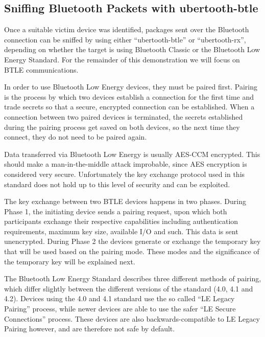 \begin{itemize}

\subsection{Sniffing Bluetooth Packets with ubertooth-btle}

Once a suitable victim device was identified, packages sent over the Bluetooth connection can be sniffed by using either ``ubertooth-btle'' or ``ubertooth-rx'', depending on whether the target is using Bluetooth Classic or the Bluetooth Low Energy Standard. For the remainder of this demonstration we will focus on BTLE communications.

In order to use Bluetooth Low Energy devices, they must be paired first. Pairing is the process by which two devices establish a connection for the first time and trade secrets so that a secure, encrypted connection can be established. When a connection between two paired devices is terminated, the secrets established during the pairing process get saved on both devices, so the next time they connect, they do not need to be paired again.

Data transferred via Bluetooth Low Energy is usually AES-CCM encrypted. This should make a man-in-the-middle attack improbable, since AES encryption is considered very secure. Unfortunately the key exchange protocol used in this standard does not hold up to this level of security and can be exploited.

The key exchange between two BTLE devices happens in two phases. During Phase 1, the initiating device sends a pairing request, upon which both participants exchange their respective capabilities including authentication requirements, maximum key size, available I/O and such. This data is sent unencrypted. During Phase 2 the devices generate or exchange the temporary key that will be used based on the pairing mode. These modes and the significance of the temporary key will be explained next.

The Bluetooth Low Energy Standard describes three different methods of pairing, which differ slightly between the different versions of the standard (4.0, 4.1 and 4.2). Devices using the 4.0 and 4.1 standard use the so called ``LE Legacy Pairing'' process, while newer devices are able to use the safer ``LE Secure Connections'' process. These devices are also backwards-compatible to LE Legacy Pairing however, and are therefore not safe by default.


\end{itemize}

